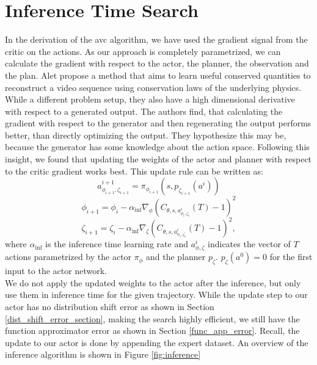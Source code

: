 \section{Inference Time Search}
\label{sec:inf_time_search}
In the derivation of the \ac{avc} algorithm, we have used the gradient signal from the critic on the actions. As our approach is completely parametrized, we can calculate 
the gradient with respect to the actor, the planner, the observation and the plan. Alet \etAl \cite{alet2021noether} propose a method that aims 
to learn useful conserved quantities to reconstruct a video sequence 
using conservation laws of the underlying physics. While a different problem setup, they also have a high dimensional derivative with respect to a 
generated output. The authors find, that 
calculating the gradient with respect to the generator and then regenerating the output performs better, than directly optimizing the output. They hypothesize this 
may be, because the generator has some knowledge about the action space. Following this insight, we found that updating the weights of the actor and planner 
with respect to the critic gradient works best. This update rule can be written as:
\begin{equation*}
    a^{i+1}_{\phi_{i+1}, \zeta_{i+1}} = \pi_{\phi_{i+1}}(s, p_{\zeta_{i+1}}(a^i))
\end{equation*}
\begin{equation*}
    \phi_{i+1} = \phi_i - \alpha_{\mathrm{inf}} \nabla_{\phi} (C_{\theta, s, a^{i}_{\phi_{i}, \zeta_{i}}}(T) - 1)^2
\end{equation*}
\begin{equation}
    \zeta_{i+1} = \zeta_i - \alpha_{\mathrm{inf}} \nabla_{\zeta} (C_{\theta, s, a^{i}_{\phi_{i}, \zeta_{i}}}(T) - 1)^2,
\end{equation}
where $\alpha_{\mathrm{inf}}$ is the inference time learning rate and $a^{i}_{\phi, \zeta}$ indicates the vector of $T$ actions parametrized by the 
actor $\pi_{\phi}$ and the planner $p_\zeta$. $p_{\zeta}(a^0) = 0$ for the first input to the actor network. \\

We do not apply the updated weights to the actor after the inference, but only use them in inference time for the given trajectory. While the update step to our 
actor has no distribution shift error as shown in Section \ref{dist_shift_error_section}, making the search highly efficient, we still have the function approximator error as 
shown in Section \ref{func_app_error}. Recall, the update to our actor is done by appending the expert dataset. An overview of the inference 
algorithm is shown in Figure \ref{fig:inference}

